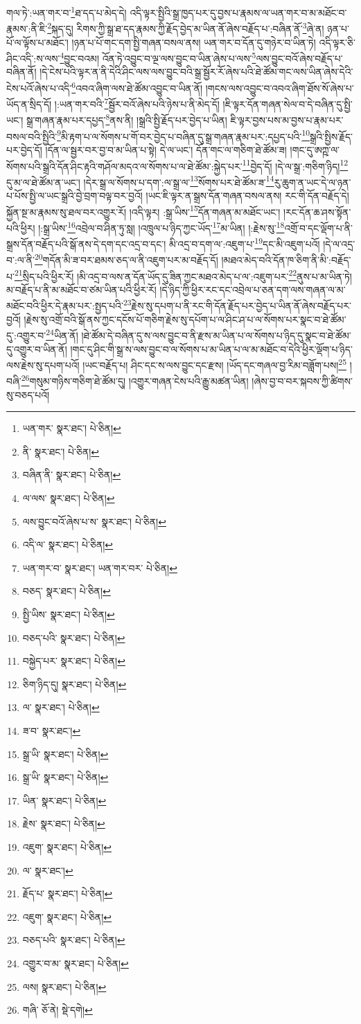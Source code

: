 གལ་ཏེ་:ཡན་གར་བ་\footnote{ཡན་གར་  སྣར་ཐང་།  པེ་ཅིན། }ཐ་དད་པ་མེད་དེ། འདི་ལྟར་སྤྱིའི་སྒྲ་ཁྱད་པར་དུ་བྱས་པ་རྣམས་ལ་ཡན་གར་བ་མ་མཐོང་བ་རྣམས་:ནི་ཇི་\footnote{ནི་  སྣར་ཐང་།  པེ་ཅིན། }སྐད་དུ། རིགས་ཀྱི་སྒྲ་ཐ་དད་རྣམས་ཀྱི་རྗོད་བྱེད་མ་ཡིན་ནོ་ཞེས་བརྗོད་པ་:བཞིན་ནོ་\footnote{བཞིན་ནི་  སྣར་ཐང་།  པེ་ཅིན། }ཞེ་ན། ཉན་པ་པོ་ལ་ལྟོས་པ་མཐོང་། །ཉན་པ་པོ་གང་དག་སྤྱི་གཞན་བསལ་ནས། ཡན་གར་བ་དོན་དུ་གཉེར་བ་ཡིན་ཏེ། འདི་ལྟར་ཅི་ཤིང་འདི་:ས་ལས་\footnote{ལ་ལས་  སྣར་ཐང་།  པེ་ཅིན། }བྱུང་བའམ། འོན་ཏེ་འབྱུང་བ་ལྔ་ལས་བྱུང་བ་ཡིན་ཞེས་པ་ལས་\footnote{ལས་བྱུང་བའོ་ཞེས་པ་ས་  སྣར་ཐང་།  པེ་ཅིན། }ལས་བྱུང་བའོ་ཞེས་བརྗོད་པ་བཞིན་ནོ། །དེ་ངེས་པའི་ལྟར་ན་ནི་དེའི་ཤིང་ལས་ལས་བྱུང་བའི་སྒྲ་སྦྱོར་རོ་ཞེས་པའི་ཐེ་ཚོམ་གང་ལས་ཡིན་ཞེས་དེའི་ངེས་པའོ་ཞེས་པ་འདི་\footnote{འདི་ལ་  སྣར་ཐང་།  པེ་ཅིན། }འབའ་ཞིག་ལས་ཐེ་ཚོམ་འབྱུང་བ་ཡིན་ནོ། །གངས་ལས་འབྱུང་བ་འབའ་ཞིག་ཐོས་སོ་ཞེས་པ་ཡོད་ན་སྲིད་དོ། །:ཡན་གར་བའི་\footnote{ཡན་གར་བ་  སྣར་ཐང་། ཡན་གར་བར་  པེ་ཅིན། }སྦྱོར་བའོ་ཞེས་པའི་ཉེས་པ་ནི་མེད་དོ། །ཇི་ལྟར་དོན་གཞན་སེལ་བ་དེ་བཞིན་དུ་སྤྱི་ཡང་། སྒྲ་གཞན་རྣམ་པར་དཔྱད་\footnote{བཅད་  སྣར་ཐང་།  པེ་ཅིན། }ནས་ནི། །སྒྲའི་སྤྱི་རྗོད་པར་བྱེད་པ་ཡིན། ཇི་ལྟར་བྱས་པས་མ་བྱས་པ་རྣམ་པར་བསལ་བའི་སྤྱིའི་\footnote{སྤྱི་ཡིས་  སྣར་ཐང་།  པེ་ཅིན། }མི་རྟག་པ་ལ་སོགས་པ་གོ་བར་བྱེད་པ་བཞིན་དུ་སྒྲ་གཞན་རྣམ་པར་:དཔྱད་པའི་\footnote{བཅད་པའི་  སྣར་ཐང་།  པེ་ཅིན། }སྒྲའི་སྤྱིས་རྗོད་པར་བྱེད་དོ། །དོན་ལ་སྦྱར་བར་བྱ་བ་མ་ཡིན་པ་སྟེ། དེ་ལ་ཡང་། དོན་གང་ལ་གཅིག་ཐེ་ཚོམ་ཟ། །གང་དུ་ཨཀྵ་ལ་སོགས་པའི་སྒྲའི་དོན་ཤིང་རྟའི་གཤོལ་མདའ་ལ་སོགས་པ་ལ་ཐེ་ཚོམ་:སྐྱེད་པར་\footnote{བསྐྱེད་པར་  སྣར་ཐང་།  པེ་ཅིན། }བྱེད་དོ། །དེ་ལ་སྒྲ་:གཅིག་ཉིད།\footnote{ཅིག་ཉིད་དུ།  སྣར་ཐང་།  པེ་ཅིན། } དུ་མ་ལ་ཐེ་ཚོམ་ན་ཡང་། །དེར་སྒྲ་ལ་སོགས་པ་དག་:ལ་སྒྲ་ལ་\footnote{ལ་  སྣར་ཐང་།  པེ་ཅིན། }སོགས་པར་ཐེ་ཚོམ་ཟ་\footnote{ཟ་བ་  སྣར་ཐང་། }རུ་ཆུག་ན་ཡང་དེ་ལ་ཉན་པ་པོས་སྤྱི་ལ་ཡང་སྒྲའི་བྱེ་བྲག་བལྟ་བར་བྱའོ། །ཡང་ཇི་ལྟར་ན་སྒྲས་དོན་གཞན་བསལ་ནས། རང་གི་དོན་བརྗོད་དེ། སྐྱོན་སྔ་མ་རྣམས་སུ་ཐལ་བར་འགྱུར་རོ། །འདི་ལྟར། :སྒྲ་ཡིས་\footnote{སྒྲ་ཡི་  སྣར་ཐང་།  པེ་ཅིན། }དོན་གཞན་མ་མཐོང་ཡང་། །རང་དོན་ཆ་ཤས་སྟོན་པའི་ཕྱིར། །:སྒྲ་ཡིས་\footnote{སྒྲ་ཡི་  སྣར་ཐང་།  པེ་ཅིན། }འབྲེལ་བ་ཤིན་ཏུ་སླ། །འཁྲུལ་པ་ཉིད་ཀྱང་ཡོད་\footnote{ཡིན་  སྣར་ཐང་།  པེ་ཅིན། }མ་ཡིན། །:རྗེས་སུ་\footnote{རྗེས་  སྣར་ཐང་།  པེ་ཅིན། }འགྲོ་བ་དང་ལྡོག་པ་ནི་སྒྲས་དོན་བརྗོད་པའི་སྒོ་ནས་དེ་དག་དང་འདྲ་བ་དང་། མི་འདྲ་བ་དག་ལ་:འཇུག་པ་\footnote{འཇུག་  སྣར་ཐང་།  པེ་ཅིན། }དང་མི་འཇུག་པའོ། །དེ་ལ་འདྲ་བ་:ལ་ནི་\footnote{ལ་  སྣར་ཐང་། }གདོན་མི་ཟ་བར་ཐམས་ཅད་ལ་ནི་འཇུག་པར་མ་བརྗོད་དོ། །མཐའ་མེད་བའི་དོན་ཁ་ཅིག་ནི་མི་:བརྗོད་པ་\footnote{རྗོད་པ་  སྣར་ཐང་།  པེ་ཅིན། }སྲིད་པའི་ཕྱིར་རོ། །མི་འདྲ་བ་ལས་ན་དོན་ཡོད་དུ་ཟིན་ཀྱང་མཐའ་མེད་པ་ལ་:འཇུག་པར་\footnote{འཇུག་  སྣར་ཐང་།  པེ་ཅིན། }ནུས་པ་མ་ཡིན་ཏེ། མ་བརྗོད་པ་ནི་མ་མཐོང་བ་ཙམ་ཡིན་པའི་ཕྱིར་རོ། །དེ་ཉིད་ཀྱི་ཕྱིར་རང་དང་འབྲེལ་པ་ཅན་དག་ལས་གཞན་ལ་མ་མཐོང་བའི་ཕྱིར་དེ་རྣམ་པར་:སྤྱད་པའི་\footnote{བཅད་པའི་  སྣར་ཐང་།  པེ་ཅིན། }རྗེས་སུ་དཔག་པ་ནི་རང་གི་དོན་རྗོད་པར་བྱེད་པ་ཡིན་ནོ་ཞེས་བརྗོད་པར་བྱའོ། །རྗེས་སུ་འགྲོ་བའི་སྒོ་ནས་ཀྱང་དངོས་པོ་གཅིག་རྗེས་སུ་དཔོག་པ་ལ་ཤིང་ཤ་པ་ལ་སོགས་པར་སྣང་བ་ཐེ་ཚོམ་དུ་:འགྱུར་བ་\footnote{འགྱུར་བ་མ་  སྣར་ཐང་།  པེ་ཅིན། }ཡིན་ནོ། །ཐེ་ཚོམ་དེ་བཞིན་དུ་ས་ལས་བྱུང་བ་ནི་རྫས་མ་ཡིན་པ་ལ་སོགས་པ་ཉིད་དུ་སྣང་བ་ཐེ་ཚོམ་དུ་འགྱུར་བ་ཡིན་ནོ། །གང་དུ་ཤིང་གི་སྒྲ་ས་ལས་བྱུང་བ་ལ་སོགས་པ་མ་ཡིན་པ་ལ་མ་མཐོང་བ་དེའི་ཕྱིར་ལྡོག་པ་ཉིད་ལས་རྗེས་སུ་དཔག་པའོ། །ཡང་བརྗོད་པ། ཤིང་དང་ས་ལས་བྱུང་དང་རྫས། །ཡོད་དང་གཞལ་བྱ་རིམ་བཟློག་པས།\footnote{ལས།  སྣར་ཐང་།  པེ་ཅིན། } །བཞི་\footnote{གཞི་  ཅོ་ནེ།  སྡེ་དགེ། }གསུམ་གཉིས་གཅིག་ཐེ་ཚོམ་དུ། །འགྱུར་གཞན་ངེས་པའི་རྒྱུ་མཚན་ཡིན། །ཞེས་བྱ་བ་བར་སྐབས་ཀྱི་ཚིགས་སུ་བཅད་པའོ། 